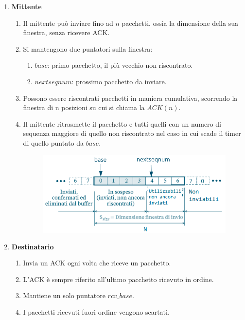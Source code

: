 \documentclass{article}
\begin{document}
\begin{enumerate}
    \item \textbf{Mittente}
    \begin{enumerate}
        \item Il mittente può inviare fino ad $n$ pacchetti, ossia la dimensione della sua finestra, senza ricevere ACK.
        \item Si mantengono due puntatori sulla finestra:
        \begin{enumerate}
            \item $base$: primo pacchetto, il più vecchio non riscontrato.
            \item $nextseqnum$: prossimo pacchetto da inviare.
        \end{enumerate}
        \item Possono essere riscontrati pacchetti in maniera cumulativa, scorrendo la finestra di n posizioni su cui si chiama la $ACK(n)$.
        \item Il mittente ritrasmette il pacchetto e tutti quelli con un numero di sequenza maggiore di quello non riscontrato nel caso in cui scade il timer di quello puntato da $base$.
        \begin{figure}[htbp]
            \center
            \includegraphics[scale=0.52]{img/GBN_mittente.png}
        \end{figure}
    \end{enumerate}
    \item \textbf{Destinatario}
    \begin{enumerate}
        \item Invia un ACK ogni volta che riceve un pacchetto.
        \item L'ACK è sempre riferito all'ultimo pacchetto ricevuto in ordine.
        \item Mantiene un solo puntatore $rcv\_base$.
        \item I pacchetti ricevuti fuori ordine vengono scartati.
        \begin{figure}[htbp]

\end{figure}
\end{enumerate}
\end{enumerate}
\end{document}
